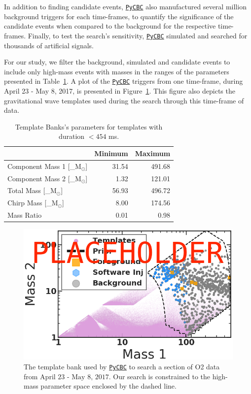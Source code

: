 \documentclass[%
 amsmath,amssymb,
 aps,
twocolumn
]{revtex4}
\newcommand{\pycbc}{{\sc \href{https://pycbc.org/}{\texttt{PyCBC}}}\xspace}
\newcommand{\mathcmd}[1]{{\sc \relax\ifmmode#1\else $#1$\fi}\xspace}
\newcommand{\msun}{\mathcmd{\text{M}_\odot}}
\begin{document}
In addition to finding candidate events, \pycbc also manufactured several million background triggers for each time-frames, to quantify the significance of the candidate events when compared to the background for the respective time-frames. Finally, to test the search's sensitivity, \pycbc simulated and searched for thousands of artificial signals. 

For our study, we filter the background, simulated and candidate events to  include only high-mass events with masses in the ranges of the parameters presented in Table~\ref{tab:parameters}. A plot of the \pycbc triggers from one time-frame, during April 23 - May 8, 2017, is presented in Figure~\ref{fig:templateBank}. This figure also depicts the gravitational wave templates used during the search through this time-frame of data. 


\begin{table}[t]

\caption[BBH parameters corresponding to duration $<454$ ms]{\label{tab:parameters}Template Banks's parameters for templates with duration $<454$ ms.}
\centering
\begin{tabular}{lrr}
\toprule
  & Minimum & Maximum\\
\midrule
Component Mass 1 [\msun] & 31.54 & 491.68\\
Component Mass 2 [\msun] & 1.32 & 121.01\\
Total Mass [\msun] & 56.93 & 496.72\\
Chirp Mass [\msun] & 8.00 & 174.56\\
Mass Ratio & 0.01 & 0.98\\
\end{tabular}
\end{table}





\begin{figure}[!h]

{\centering \includegraphics[width=0.75\linewidth]{images/template_bank_masses} 

}
\caption[High-mass BCR search space.]{The template bank used by \pycbc to search a section of O2 data from $\text{April 23 - May 8, 2017}$. Our search is constrained to the high-mass parameter space enclosed by the dashed line.}\label{fig:templateBank}
\end{figure}
\end{document}
